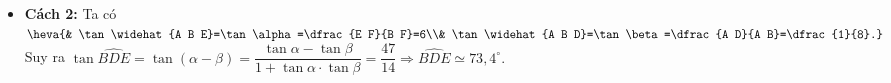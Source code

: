 \begin{ex}
{\begin{itemize}
{
}
Xét $\triangle A B D$ vuông tại $A$, $BD=\sqrt{A B^2+A D^2}=\sqrt{4^2+\left(\dfrac{1}{2}\right)^2}=\dfrac{\sqrt{65}}{2}$.\\ 
Áp dụng hệ thức lượng trong tam giác vuông ta có 
$\heva{& \sin \beta=\dfrac{A D}{B D}=\dfrac{1}{\sqrt{65}}\\& \cos \beta=\dfrac{A B}{B D}=\dfrac{8}{\sqrt{65}}.}$\\
Áp dụng công thức cộng ta có 
\item \textbf{Cách 2:}
Ta có 
$\heva{& \tan \widehat{A B E}=\tan \alpha=\dfrac{E F}{B F}=6\\&  \tan \widehat{A B D}=\tan \beta=\dfrac{A D}{A B}=\dfrac{1}{8}.}$
Suy ra $\tan \widehat{B D E}=\tan (\alpha-\beta)=\dfrac{\tan \alpha-\tan \beta}{1+\tan \alpha \cdot \tan \beta}=\dfrac{47}{14} \Rightarrow \widehat{B D E} \simeq 73{,}4^{\circ}.$
\end{itemize}
}
\end{ex}


